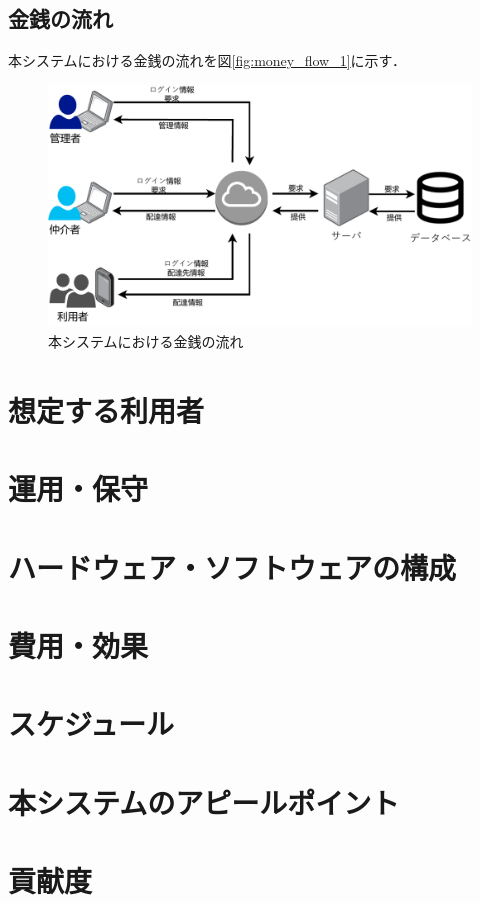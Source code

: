 \documentclass[a4paper, titlepage]{jsarticle}
\begin{document}
\subsection{金銭の流れ}
本システムにおける金銭の流れを図\ref{fig:money_flow_1}に示す．

\begin{figure}[H]
  \centering
  \includegraphics[width=0.6\linewith]{./info_flow.pdf}
  \caption{本システムにおける金銭の流れ}
  \label{fig:info_flow_1}
\end{figure}


\section{想定する利用者}

\section{運用・保守}

\section{ハードウェア・ソフトウェアの構成}

\section{費用・効果}

\section{スケジュール}

\section{本システムのアピールポイント}

\section{貢献度}
\end{document}
